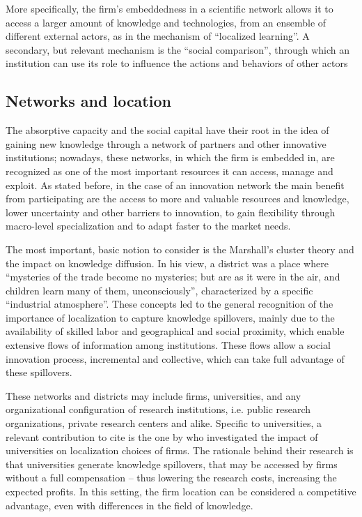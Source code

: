 More specifically, the firm's embeddedness in a scientific network allows it to access a larger amount of knowledge and technologies, from an ensemble of different external actors, as in the mechanism of \enquote{localized learning}. A secondary, but relevant mechanism is the \enquote{social comparison}, through which an institution can use its role to influence the actions and behaviors of other actors \citep{Slavova2015}

\subsection{Networks and location}

The absorptive capacity and the social capital have their root in the idea of gaining new knowledge through a network of partners and other innovative institutions; nowadays, these networks, in which the firm is embedded in, are recognized as one of the most important resources it can access, manage and exploit. As stated before, in the case of an innovation network the main benefit from participating are the access to more and valuable resources and knowledge, lower uncertainty and other barriers to innovation, to gain flexibility through macro-level specialization and to adapt faster to the market needs. 

The most important, basic notion to consider is the Marshall's cluster theory \citep{Marshall1890} and the impact on knowledge diffusion. In his view, a district was a place where \enquote{mysteries of the trade become no mysteries; but are as it were in the air, and children learn many of them, unconsciously}, characterized by a specific \enquote{industrial atmosphere}. These concepts led to the general recognition of the importance of localization to capture knowledge spillovers, mainly due to the availability of skilled labor and geographical and social proximity, which enable extensive flows of information among institutions. These flows allow a social innovation process, incremental and collective, which can take full advantage of these spillovers.

These networks and districts may include firms, universities, and any organizational configuration of research institutions, i.e. public research organizations, private research centers and alike. Specific to universities, a relevant contribution to cite is the one by \citet{Audretsch2004} who investigated the impact of universities on localization choices of firms. The rationale behind their research is that universities generate knowledge spillovers, that may be accessed by firms without a full compensation – thus lowering the research costs, increasing the expected profits. In this setting, the firm location can be considered a competitive advantage, even with differences in the field of knowledge. 

